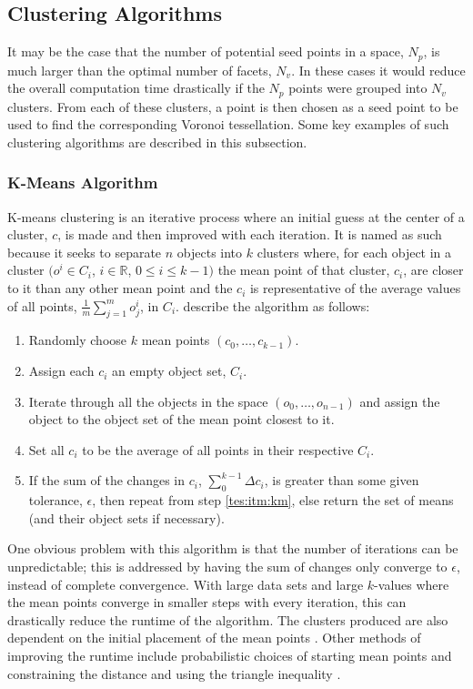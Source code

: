 \subsection{Clustering Algorithms} \label{tes:sec:clu}
It may be the case that the number of potential seed points in a space, $N_p$, is much larger than the optimal number of facets, $N_v$. In these cases it would reduce the overall computation time drastically if the $N_p$ points were grouped into $N_v$ clusters. From each of these clusters, a point is then chosen as a seed point to be used to find the corresponding Voronoi tessellation. Some key examples of such clustering algorithms are described in this subsection.
%
\subsubsection{K-Means Algorithm}\label{tes:ssec:kma}
K-means clustering is an iterative process where an initial guess at the center of a cluster, $c$, is made and then improved with each iteration. It is named as such because it seeks to separate $n$ objects into $k$ clusters where, for each object in a cluster $( o^i \in C_i$, $i \in \mathbb{R}$, $0\leq i \leq k-1)$ the mean point of that cluster, $c_i$, are closer to it than any other mean point and the $c_i$ is representative of the average values of all points, $\frac{1}{m}\sum^m_{j=1}o^i_j$, in $C_i$. \citet{way2012advances} describe the algorithm as follows:
\begin{enumerate}
  \item	Randomly choose $k$ mean points $(c_0,\dots,c_{k-1})$.
  \item\label{tes:itm:km} Assign each $c_i$ an empty object set, $C_i$.
  \item Iterate through all the objects in the space $(o_0,\dots,o_{n-1})$ and assign the object to the object set of the mean point closest to it.
  \item Set all $c_i$ to be the average of all points in their respective $C_i$.
  \item If the sum of the changes in $c_i$, $\sum_0^{k-1} \Delta c_i$, is greater than some given tolerance, $\epsilon$, then repeat from step \ref{tes:itm:km}, else return the set of means (and their object sets if 	      necessary).
\end{enumerate}
One obvious problem with this algorithm is that the number of iterations can be unpredictable; this is addressed by having the sum of changes only converge to $\epsilon$, instead of complete convergence. With large data sets and large $k$-values where the mean points converge in smaller steps with every iteration, this can drastically reduce the runtime of the algorithm. The clusters produced are also dependent on the initial placement of the mean points \citep{way2012advances}. Other methods of improving the runtime include probabilistic choices of starting mean points \citep{arthur2007k} and constraining the distance and using the triangle inequality \citep{hamerly2010making}.
%
